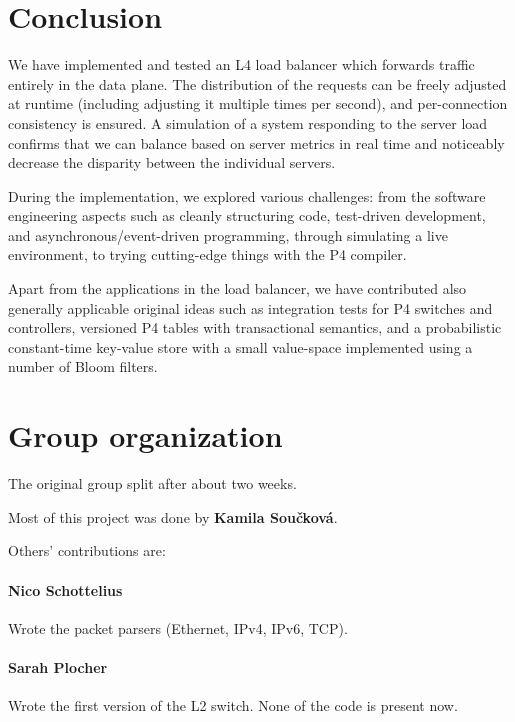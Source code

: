 \documentclass[11pt,oneside,a4paper]{article}
\begin{document}
\section{Conclusion}

We have implemented and tested an L4 load balancer which forwards traffic
entirely in the data plane. The distribution of the requests can be freely
adjusted at runtime (including adjusting it multiple times per second), and
per-connection consistency is ensured. A simulation of a system responding to
the server load confirms that we can balance based on server metrics in real
time and noticeably decrease the disparity between the individual servers.

During the implementation, we explored various challenges: from the software
engineering aspects such as cleanly structuring code, test-driven development,
and asynchronous/event-driven programming, through simulating a live
environment, to trying cutting-edge things with the P4 compiler.

Apart from the applications in the load balancer, we have contributed also
generally applicable original ideas such as integration tests for P4 switches
and controllers, versioned P4 tables with transactional semantics, and a
probabilistic constant-time key-value store with a small value-space implemented
using a number of Bloom filters.

\label{lastpage} %
\clearpage
{}



\clearpage
\appendix
{}

\section{Group organization}
The original group split after about two weeks.

Most of this project was done by \textbf{Kamila Sou\v{c}kov\'{a}}.

Others' contributions are:

\paragraph{Nico Schottelius}
Wrote the packet parsers (Ethernet, IPv4, IPv6, TCP).

\paragraph{Sarah Plocher}
Wrote the first version of the L2 switch.
None of the code is present now.
\end{document}
